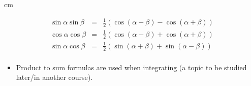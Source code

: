 \begin{frame}
 cm
\begin{proposition}
\[
\begin{array}{rcl}
\sin \alpha \sin \beta &=&\displaystyle \frac{1}{2}\left(\cos( \alpha -\beta) -\cos(\alpha+\beta) \right)\\
\cos \alpha \cos \beta &=&\displaystyle \frac{1}{2}\left( \cos( \alpha -\beta) +\cos(\alpha+\beta) \right)\\
\sin \alpha \cos \beta &=&\displaystyle \frac{1}{2}\left(\sin( \alpha +\beta) +\sin(\alpha-\beta) \right)\\
\end{array}
\]
\end{proposition}
\begin{itemize}
\item Product to sum formulas are used when integrating (a topic to be studied later/in another course).
\end{itemize}
\vskip 10cm

\end{frame}